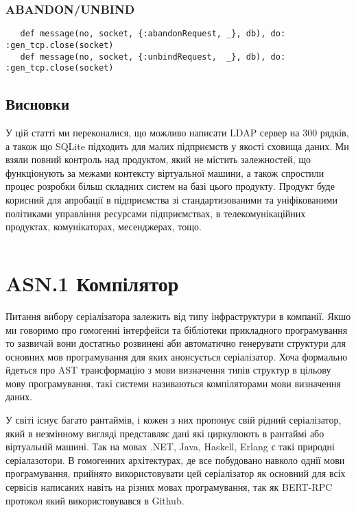 \subsubsection{ABANDON/UNBIND}

\begin{lstlisting}
   def message(no, socket, {:abandonRequest, _}, db), do: :gen_tcp.close(socket)
   def message(no, socket, {:unbindRequest,  _}, db), do: :gen_tcp.close(socket)
\end{lstlisting}

\subsection{Висновки}

У цій статті ми переконалися, що можливо написати LDAP сервер на 300 рядків, а також що SQLite підходить для малих підприємств у якості сховища даних. Ми взяли повний контроль над продуктом, який не містить залежностей, що функціонують за межами контексту віртуальної машини, а також спростили процес розробки більш складних систем на базі цього продукту. Продукт буде корисний для апробації в підприємства зі стандартизованими та уніфікованими політиками управління ресурсами підприємствах, в телекомунікаційних продуктах, комунікаторах, месенджерах, тощо.

\begin{lstlisting}
\end{lstlisting}

\newpage
\section{ASN.1 Компілятор}

Питання вибору серіалізатора залежить від типу інфраструктури в компанії. Якшо ми говоримо про гомогенні інтерфейси та бібліотеки прикладного програмування то зазвичай вони достатньо розвинені аби автоматично генерувати структури для основних мов програмування для яких анонсується серіалізатор. Хоча формально йдеться про AST трансформацію з мови визначення типів структур в цільову мову програмування, такі системи називаються компіляторами мови визначення даних.

У світі існує багато рантаймів, і кожен з них пропонує свій рідний серіалізатор, який в незмінному вигляді представляє дані які циркулюють в рантаймі або віртуальній машині. Так на мовах .NET, Java, Haskell, Erlang є такі природні серіалазотори. В гомогенних архітектурах, де все побудовано навколо однії мови програмування, прийнято використовувати цей серіалізатор як основний для всіх сервісів написаних навіть на різних мовах програмування, так як BERT-RPC протокол який використовувався в Github.

